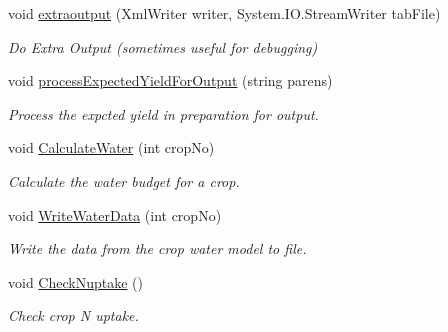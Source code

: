 \begin{DoxyCompactItemize}
\mbox{\label{class_crop_sequence_class_a280225949ad2e165a2106fed4a681958}} 
void \mbox{\hyperlink{class_crop_sequence_class_a280225949ad2e165a2106fed4a681958}{extraoutput}} (Xml\+Writer writer, System.\+I\+O.\+Stream\+Writer tab\+File)
\begin{DoxyCompactList}\small\item\em Do Extra Output (sometimes useful for debugging) \end{DoxyCompactList}\item 
\mbox{\label{class_crop_sequence_class_aff5bfa87d2cc1dea5dea8f29a4df32f0}} 
void \mbox{\hyperlink{class_crop_sequence_class_aff5bfa87d2cc1dea5dea8f29a4df32f0}{process\+Expected\+Yield\+For\+Output}} (string parens)
\begin{DoxyCompactList}\small\item\em Process the expcted yield in preparation for output. \end{DoxyCompactList}\item 
\mbox{\label{class_crop_sequence_class_a6da5aec6d8259ce418a2948763ae20dd}} 
void \mbox{\hyperlink{class_crop_sequence_class_a6da5aec6d8259ce418a2948763ae20dd}{Calculate\+Water}} (int crop\+No)
\begin{DoxyCompactList}\small\item\em Calculate the water budget for a crop. \end{DoxyCompactList}\item 
\mbox{\label{class_crop_sequence_class_a51e6061d67d1d2a167fb2c3ae9ea843c}} 
void \mbox{\hyperlink{class_crop_sequence_class_a51e6061d67d1d2a167fb2c3ae9ea843c}{Write\+Water\+Data}} (int crop\+No)
\begin{DoxyCompactList}\small\item\em Write the data from the crop water model to file. \end{DoxyCompactList}\item 
\mbox{\label{class_crop_sequence_class_a2299f9fcaead0dbd1e23d94b45c7196a}} 
void \mbox{\hyperlink{class_crop_sequence_class_a2299f9fcaead0dbd1e23d94b45c7196a}{Check\+Nuptake}} ()
\begin{DoxyCompactList}\small\item\em Check crop N uptake. \end{DoxyCompactList}\end{DoxyCompactItemize}
